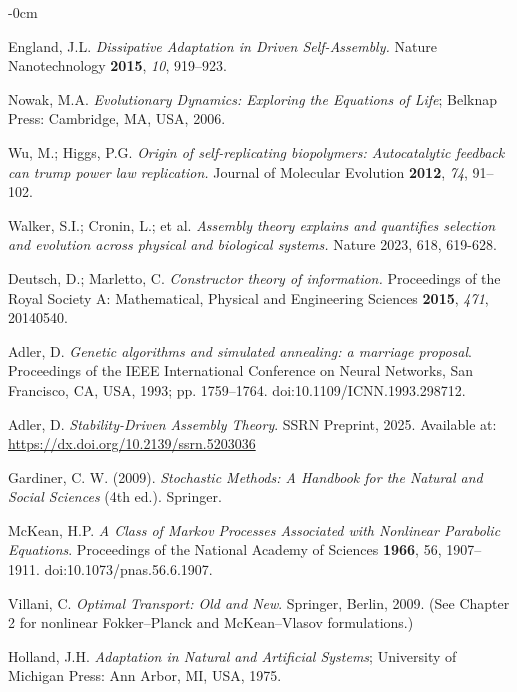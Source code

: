\documentclass[life,article,submit,pdftex,moreauthors]{Definitions/mdpi}
\begin{document}
\begin{adjustwidth}{-\extralength}{0cm}
{\begin{thebibliography}{999}
England, J.L. \textit{Dissipative Adaptation in Driven Self-Assembly.} Nature Nanotechnology \textbf{2015}, \textit{10}, 919–923.

Nowak, M.A. \textit{Evolutionary Dynamics: Exploring the Equations of Life}; Belknap Press: Cambridge, MA, USA, 2006.


Wu, M.; Higgs, P.G. \textit{Origin of self-replicating biopolymers: Autocatalytic feedback can trump power law replication.} Journal of Molecular Evolution \textbf{2012}, \textit{74}, 91–102.

Walker, S.I.; Cronin, L.; et al. \textit{Assembly theory explains and quantifies selection and evolution across physical and biological systems.} Nature 2023, 618, 619-628.

Deutsch, D.; Marletto, C. \textit{Constructor theory of information.} Proceedings of the Royal Society A: Mathematical, Physical and Engineering Sciences \textbf{2015}, \textit{471}, 20140540.

Adler, D. \textit{Genetic algorithms and simulated annealing: a marriage proposal}. Proceedings of the IEEE International Conference on Neural Networks, San Francisco, CA, USA, 1993; pp. 1759--1764. doi:10.1109/ICNN.1993.298712.

Adler, D.
\textit{Stability-Driven Assembly Theory}.
SSRN Preprint, 2025. Available at: \url{https://dx.doi.org/10.2139/ssrn.5203036}

 Gardiner, C. W. (2009). \textit{Stochastic Methods: A Handbook for the Natural and Social Sciences} (4th ed.). Springer.

McKean, H.P. 
\textit{A Class of Markov Processes Associated with Nonlinear Parabolic Equations}. 
Proceedings of the National Academy of Sciences \textbf{1966}, 56, 1907–1911. doi:10.1073/pnas.56.6.1907.

Villani, C. 
\textit{Optimal Transport: Old and New}. Springer, Berlin, 2009. 
(See Chapter 2 for nonlinear Fokker–Planck and McKean–Vlasov formulations.)


Holland, J.H. \textit{Adaptation in Natural and Artificial Systems}; University of Michigan Press: Ann Arbor, MI, USA, 1975.


\end{thebibliography}}
\end{adjustwidth}
\end{document}
